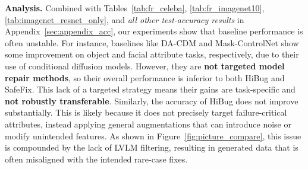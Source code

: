 \documentclass[10pt]{article} %
\newcommand{\model}{SafeFix\xspace}
\newcommand{\hibug}{HiBug\xspace}
\begin{document}
\begin{table}
\vspace{-10pt}
\centering
\small
\setlength{\tabcolsep}{4pt}
\renewcommand{\arraystretch}{0.95}
\caption{Test accuracy (\%) on ImageNet10 using ResNet-18.}
\label{tab:imagenet_resnet_only}

\vspace{-10pt}
\end{table}


\noindent\textbf{Analysis.}
Combined with Tables~\ref{tab:fr_celeba}, \ref{tab:fr_imagenet10}, \ref{tab:imagenet_resnet_only}, and \emph{all other test-accuracy results} in Appendix~\ref{sec:appendix_acc}, our experiments show that baseline performance is often unstable. For instance, baselines like DA-CDM and Mask-ControlNet show some improvement on object and facial attribute tasks, respectively, due to their use of conditional diffusion models. However, they are \textbf{not targeted model repair methods}, so their overall performance is inferior to both HiBug and \model. This lack of a targeted strategy means their gains are task-specific and \textbf{not robustly transferable}.
Similarly, the accuracy of \hibug{} does not improve substantially. This is likely because it does not precisely target failure-critical attributes, instead applying general augmentations that can introduce noise or modify unintended features. As shown in Figure~\ref{fig:picture_compare}, this issue is compounded by the lack of LVLM filtering, resulting in generated data that is often misaligned with the intended rare-case fixes.
\end{document}
